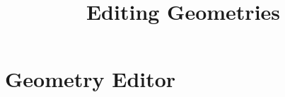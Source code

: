 \documentclass{report}
\begin{document}
\title{Editing Geometries}
\maketitle{}

\chapter{Geometry Editor}
 
\end{document}
